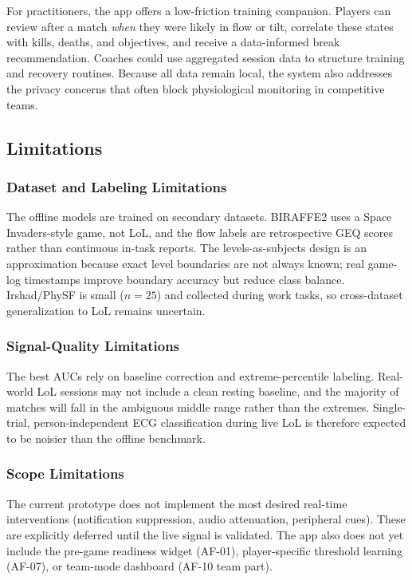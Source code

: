 For practitioners, the app offers a low-friction training companion. Players can review after a match \textit{when} they were likely in flow or tilt, correlate these states with kills, deaths, and objectives, and receive a data-informed break recommendation. Coaches could use aggregated session data to structure training and recovery routines. Because all data remain local, the system also addresses the privacy concerns that often block physiological monitoring in competitive teams.

\subsection{Limitations}

\subsubsection{Dataset and Labeling Limitations}

The offline models are trained on secondary datasets. BIRAFFE2 uses a Space Invaders-style game, not LoL, and the flow labels are retrospective GEQ scores rather than continuous in-task reports. The levels-as-subjects design is an approximation because exact level boundaries are not always known; real game-log timestamps improve boundary accuracy but reduce class balance. Irshad/PhySF is small ($n=25$) and collected during work tasks, so cross-dataset generalization to LoL remains uncertain.

\subsubsection{Signal-Quality Limitations}

The best AUCs rely on baseline correction and extreme-percentile labeling. Real-world LoL sessions may not include a clean resting baseline, and the majority of matches will fall in the ambiguous middle range rather than the extremes. Single-trial, person-independent ECG classification during live LoL is therefore expected to be noisier than the offline benchmark.

\subsubsection{Scope Limitations}

The current prototype does not implement the most desired real-time interventions (notification suppression, audio attenuation, peripheral cues). These are explicitly deferred until the live signal is validated. The app also does not yet include the pre-game readiness widget (AF-01), player-specific threshold learning (AF-07), or team-mode dashboard (AF-10 team part).

